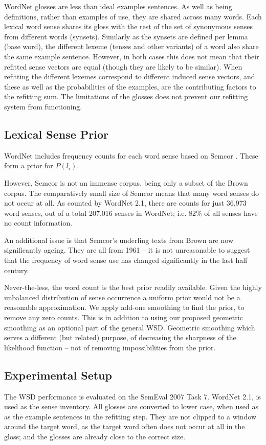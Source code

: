 \documentclass{sig-alternate}
\begin{document}
WordNet glosses are less than ideal examples sentences. As well as being definitions, rather than examples of use, they are shared across many words. Each lexical word sense shares its gloss with the rest of the set of synonymous senses from different words (synsets). Similarly as the synsets are defined per lemma (base word), the different lexeme (tenses and other variants) of a word also share the same example sentence. However, in both cases this does not mean that their refitted sense vectors are equal (though they are likely to be similar). When refitting the different lexemes correspond to different induced sense vectors, and these as well as the probabilities of the examples, are the contributing factors to the refitting sum. The limitations of the glosses does not prevent our refitting system from functioning.

\subsection{Lexical Sense Prior}
WordNet includes frequency counts for each word sense based on Semcor \textcite{tengi1998design}. These form a prior for $P(l_i)$.

However, Semcor is not an immense corpus, being only a subset of the Brown corpus. The comparatively small size of Semcor means that many word senses do not occur at all. As counted by WordNet 2.1, there are counts for just  36,973 word senses, out of a total 207,016 senses in WordNet; i.e. 82\% of all senses have no count information.

An additional issue is that Semcor's underling texts from Brown are now significantly ageing. They are all from 1961 \cite{francis1979brown} -- it is not unreasonable to suggest that the frequency of word sense use has changed significantly in the last half century.

Never-the-less, the word count is the best prior readily available. Given the highly unbalanced distribution of sense occurrence a uniform prior would not be a reasonable approximation.
We apply add-one smoothing to find the prior, to remove any zero counts.
This is in addition to using our proposed geometric smoothing as an optional part of the general WSD.
Geometric smoothing which serves a different (but related) purpose, of decreasing the sharpness of the likelihood function -- not of removing impossibilities from the prior.

\subsection {Experimental Setup}
The WSD performance is evaluated on the SemEval 2007 Task 7. 
WordNet 2.1, is used as the sense inventory.
All glosses are converted to lower case, when used as as the example sentences in the refitting step. 
They are not clipped to a window around the target word, as the target word often does not occur at all in the gloss; and the glosses are already close to the correct size.
\end{document}
